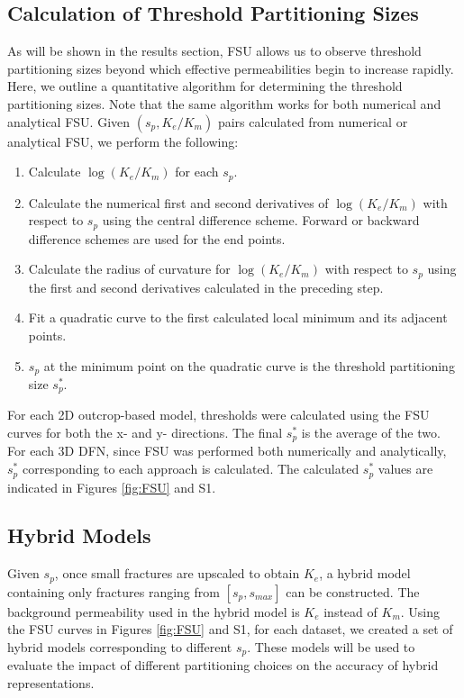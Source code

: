 \documentclass[draft]{agujournal2018}
\begin{document}
\subsection{Calculation of Threshold Partitioning Sizes}
As will be shown in the results section, FSU allows us to observe threshold partitioning sizes beyond which effective permeabilities begin to increase rapidly. Here, we outline a quantitative algorithm for determining the threshold partitioning sizes. Note that the same algorithm works for both numerical and analytical FSU. Given $\left(s_p,K_{e}/K_m\right)$ pairs calculated from numerical or analytical FSU, we perform the following:
\begin{enumerate}
	\item Calculate $\log(K_{e}/K_m)$ for each $s_p$.
	\item Calculate the numerical first and second derivatives of $\log(K_{e}/K_m)$ with respect to $s_p$ using the central difference scheme. Forward or backward difference schemes are used for the end points.
	\item Calculate the radius of curvature for $\log(K_{e}/K_m)$ with respect to $s_p$ using the first and second derivatives calculated in the preceding step.
	\item Fit a quadratic curve to the first calculated local minimum and its adjacent points.
	\item $s_p$ at the minimum point on the quadratic curve is the threshold partitioning size $s_p^*$.
\end{enumerate}

For each 2D outcrop-based model, thresholds were calculated using the FSU curves for both the x- and y- directions. The final $s_p^*$ is the average of the two. For each 3D DFN, since FSU was performed both numerically and analytically, $s_p^*$ corresponding to each approach is calculated. The calculated $s_p^*$ values are indicated in Figures \ref{fig:FSU} and S1.

\subsection{Hybrid Models}
Given $s_p$, once small fractures are upscaled to obtain $K_e$, a hybrid model containing only fractures ranging from $[s_p,s_{max}]$ can be constructed. The background permeability used in the hybrid model is $K_e$ instead of $K_m$. Using the FSU curves in Figures \ref{fig:FSU} and S1, for each dataset, we created a set of hybrid models corresponding to different $s_p$. These models will be used to evaluate the impact of different partitioning choices on the accuracy of hybrid representations.
\end{document}
